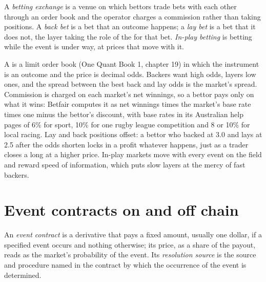 \begin{definition}\label{def:m3:prediction-and-betting-markets:exchange}
A \emph{betting exchange} is a venue on which bettors trade bets with each other through an order book and the
operator charges a commission rather than taking positions. A \emph{back bet} is a bet that an outcome happens; a \emph{lay
bet} is a bet that it does not, the layer taking the role of the  for that bet. \emph{In-play betting} is betting while the event is under way, at prices that move with it.
\end{definition}

A  is a limit order book (One Quant Book 1, chapter 19) in which the instrument is an outcome and the price is decimal odds.
Backers want high odds, layers low ones, and the spread between the best back and lay odds is the market's spread. Commission is charged on each
market's net winnings, so a bettor pays only on what it wins: Betfair computes it as net winnings times the market's base rate times one minus
the bettor's discount, with base rates in its Australian help pages of 6\% for sport, 10\% for one rugby league competition and 8 or 10\% for local
racing. Lay and back positions offset: a bettor who backed at 3.0 and lays at 2.5 after the
odds shorten locks in a profit whatever happens, just as a trader closes a long at a higher price. In-play markets move with every event on the
field and reward speed of information, which puts slow layers at the mercy of fast backers.

\section{Event contracts on and off chain}

\begin{definition}\label{def:m3:prediction-and-betting-markets:event}
An \emph{event contract} is a derivative that pays a fixed amount, usually one dollar, if a specified event occurs and nothing
otherwise; its price, as a share of the payout, reads as the market's probability of the event. Its \emph{resolution source}
is the source and procedure named in the contract by which the occurrence of the event is determined.
\end{definition}

